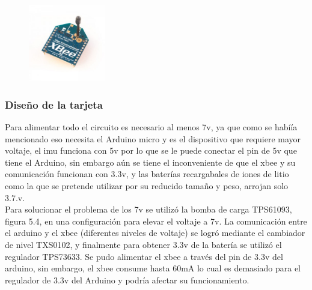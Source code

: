      \begin{figure}[htbp]
     	\centering
     	\includegraphics[width=0.3\textwidth]{./pictures/xbee}
     	\caption{}\label{fig: figura}
     \end{figure}
     
     \subsubsection{Diseño de la tarjeta}
     Para alimentar todo el circuito es necesario al menos 7v, ya que como se habíía mencionado eso necesita el Arduino micro y es el dispositivo que requiere mayor voltaje, el imu funciona con 5v por lo que se le puede conectar el pin de 5v que tiene el Arduino, sin embargo aún se tiene el inconveniente de que el xbee y su comunicación funcionan con 3.3v, y las baterías recargabales de iones de litio como la que se pretende utilizar por su reducido tamaño y peso, arrojan solo 3.7.v.\\
     Para solucionar el problema de los 7v se utilizó la bomba de carga TPS61093, figura 5.4, en una configuración para elevar el voltaje a 7v. La comunicación entre el arduino y el xbee (diferentes niveles de voltaje) se logró mediante el cambiador de nivel TXS0102, y finalmente para obtener 3.3v de la batería se utilizó el regulador TPS73633. Se pudo alimentar el xbee a través del pin de 3.3v del arduino, sin embargo, el xbee consume hasta 60mA lo cual es demasiado para el regulador de 3.3v del Arduino y podría afectar su funcionamiento.
     
